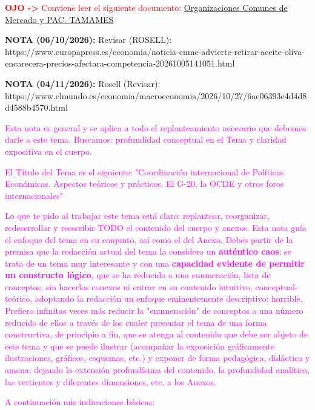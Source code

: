 \documentclass[10pt,a4paper]{article}
\newcommand{\modificaciones}[1]{
  \begin{tcolorbox}[
    colback=white,
    colframe=red,
    title={Modificaciones a realizar},
    before upper={\setlength{\parindent}{0.5cm}\setlength{\parskip}{0.5\baselineskip}}
  ]
  #1
  \end{tcolorbox}
}
\newcounter{anexo}
\begin{document}
\modificaciones{
    \textcolor{red}{\textbf{OJO ->} Conviene leer el siguiente documento:} \href{https://www.mapa.gob.es/ministerio/pags/biblioteca/fondo/pdf/5384_16.pdf}{Organizaciones Comunes de Mercado y PAC. TAMAMES}

    \textbf{NOTA (06/10/2026):} Revisar (ROSELL): https://www.europapress.es/economia/noticia-cnmc-advierte-retirar-aceite-oliva-encarecera-precios-afectara-competencia-20261005141051.html

    \textbf{NOTA (04/11/2026):} Rosell (Revisar): https://www.elmundo.es/economia/macroeconomia/2026/10/27/6ae06393e4d4d8d4588b4570.html

    \textcolor{magenta}{Esta nota es general y se aplica a todo el replanteamiento necesario que debemos darle a este tema. Buscamos: profundidad conceptual en el Tema y claridad expositiva en el cuerpo.

    El Título del Tema es el siguiente: "Coordinación internacional de Políticas Económicas. Aspectos teóricos y prácticos. El G-20, la OCDE y otros foros internacionales"

    Lo que te pido al trabajar este tema está claro: replantear, reorganizar, redeserrollar y reescribir TODO el contenido del cuerpo y anexos. Esta nota guía el enfoque del tema en su conjunto, así como el del Anexo. Debes partir de la premisa que la redacción actual del tema la considero un \textbf{auténtico caos}: se trata de un tema muy interesante y con una \textbf{capacidad evidente de permitir un constructo lógico}, que se ha reducido a una enumeración, lista de conceptos, sin hacerlos conexos ni entrar en su contenido intuitivo, conceptual-teórico, adoptando la redacción un enfoque eminentemente descriptivo: horrible. Prefiero infinitas veces más reducir la "enumeración" de conceptos a una número reducido de ellos a través de los cuales presentar el tema de una forma constructiva, de principio a fin, que se atenga al contenido que debe ser objeto de este tema y que se puede ilustrar (acompañar la exposición gráficamente ilustraciones, gráficos, esquemas, etc.) y exponer de forma pedagógica, didáctica y amena; dejando la extensión profundísima del contenido, la profundidad analítica, las vertientes y diferentes dimensiones, etc. a los Anexos.
    
    A continuación mis indicaciones básicas:
    
}}
\end{document}
